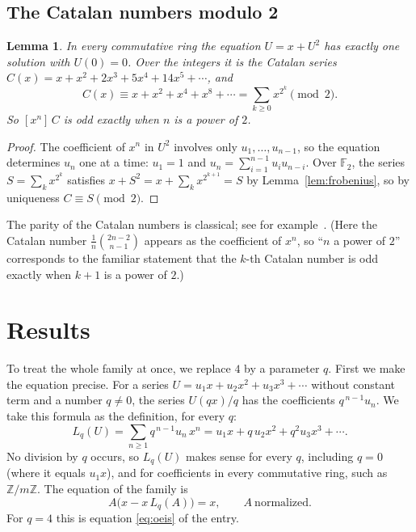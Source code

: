 \documentclass[11pt,a4paper]{article}
\newtheorem{lemma}[theorem]{Lemma}
\theoremstyle{definition}
\theoremstyle{remark}
\newcommand{\Z}{\mathbb{Z}}
\newcommand{\F}{\mathbb{F}}
\newcommand{\coeff}[2]{[x^{#1}]\,#2}
\begin{document}
\subsection{The Catalan numbers modulo 2}
\begin{lemma}\label{lem:catalan}
In every commutative ring the equation $U=x+U^2$ has exactly one solution with $U(0)=0$. Over the integers it is the
Catalan series $C(x)=x+x^2+2x^3+5x^4+14x^5+\cdots$, and
\[
C(x)\equiv x+x^2+x^4+x^8+\cdots=\sum_{k\ge0}x^{2^k}\pmod 2 .
\]
So $\coeff{n}{C}$ is odd exactly when $n$ is a power of $2$.
\end{lemma}

\begin{proof}
The coefficient of $x^n$ in $U^2$ involves only $u_1,\dots,u_{n-1}$, so the equation determines $u_n$ one at a time:
$u_1=1$ and $u_n=\sum_{i=1}^{n-1}u_iu_{n-i}$. Over $\F_2$, the series $S=\sum_kx^{2^k}$ satisfies
$x+S^2=x+\sum_kx^{2^{k+1}}=S$ by Lemma~\ref{lem:frobenius}, so by uniqueness $C\equiv S\pmod2$.
\end{proof}
The parity of the Catalan numbers is classical; see for example~\cite{deutschsagan}. (Here the Catalan number
$\frac1{n}\binom{2n-2}{n-1}$ appears as the coefficient of $x^n$, so ``$n$ a power of $2$'' corresponds to the familiar
statement that the $k$-th Catalan number is odd exactly when $k+1$ is a power of $2$.)


\section{Results}\label{sec:results}

To treat the whole family at once, we replace $4$ by a parameter $q$. First we make the equation
precise. For a series $U=u_1x+u_2x^2+u_3x^3+\cdots$ without constant term and a number $q\ne0$, the series $U(qx)/q$
has the coefficients $q^{\,n-1}u_n$. We take this formula as the definition, for every $q$:
\begin{equation}\label{eq:L}
L_q(U)=\sum_{n\ge1}q^{\,n-1}u_n\,x^n=u_1x+q\,u_2x^2+q^2u_3x^3+\cdots .
\end{equation}
No division by $q$ occurs, so $L_q(U)$ makes sense for every $q$, including $q=0$ (where it equals $u_1x$), and for
coefficients in every commutative ring, such as $\Z/m\Z$. The equation of the family is
\begin{equation}\label{eq:def}
A\bigl(x-x\,L_q(A)\bigr)=x,\qquad A\ \text{normalized}.
\end{equation}
For $q=4$ this is equation \eqref{eq:oeis} of the entry.
\end{document}
